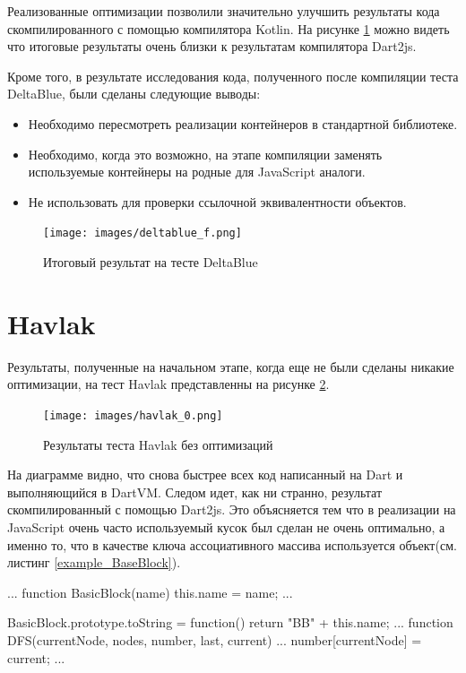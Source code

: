 Реализованные оптимизации позволили значительно улучшить результаты кода скомпилированного с помощью компилятора Kotlin. На рисунке \ref{deltablue_f} можно видеть что  итоговые результаты очень близки к результатам компилятора Dart2js.


Кроме того, в результате исследования кода, полученного после компиляции теста DeltaBlue, были сделаны следующие выводы:
\begin{itemize}
\item Необходимо пересмотреть реализации контейнеров в стандартной библиотеке.
\item Необходимо, когда это возможно, на этапе компиляции заменять используемые контейнеры на родные для JavaScript аналоги.
\item Не использовать  для проверки ссылочной эквивалентности объектов.
\end{itemize}

\begin{figure}[ht!]
\centering
\texttt{[image: images/deltablue\_f.png]}
\caption{Итоговый результат на тесте DeltaBlue}
\label{deltablue_f}
\end{figure}

\newpage
\section{Havlak}

Результаты, полученные на начальном этапе, когда еще не были сделаны никакие оптимизации, на тест Havlak представленны на рисунке \ref{havlak_0}.

\begin{figure}[ht!]
\centering
\texttt{[image: images/havlak\_0.png]}
\caption{Результаты теста Havlak без оптимизаций}
\label{havlak_0}
\end{figure}

На диаграмме видно, что снова быстрее всех код написанный на Dart и выполняющийся в DartVM. Следом идет, как ни странно, результат скомпилированный с помощью Dart2js. Это объясняется тем что в реализации на JavaScript очень часто используемый кусок был сделан не очень оптимально, а именно то, что в качестве ключа ассоциативного массива используется объект(см. листинг \ref{example_BaseBlock}).

\begin{code}
\begin{JavaScript}[caption=Пример неоптимального использования ассоциативного массива на JavaScript, label=example_BaseBlock]
...
function BasicBlock(name)
{
  this.name = name;
  ...
}

BasicBlock.prototype.toString = function() {
  return "BB" + this.name;
}
...
function DFS(currentNode, nodes, number, last, current) {
...
  number[currentNode] = current;
...
}
\end{JavaScript}
\end{code}

